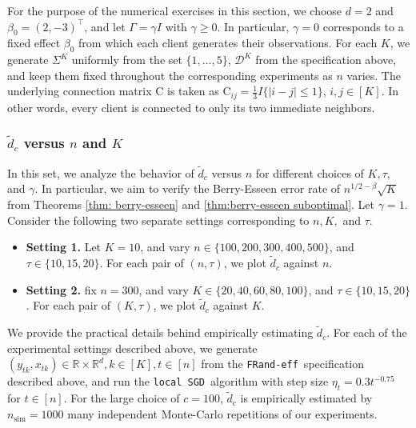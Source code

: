 \documentclass[a4paper,11pt]{article}
\numberwithin{equation}{section}
\theoremstyle{plain}
\theoremstyle{remark}
\def\R{\mathbb{R}}
\newcommand{\DFL}{\texttt{local SGD}}
\newcommand{\model}{\texttt{FRand-eff}}
\begin{document}
\noindent For the purpose of the numerical exercises in this section, we choose $d=2$ and $\beta_0=(2,-3)^\top$, and let $\Gamma=\gamma I$ with $\gamma\geq 0$. In particular, $\gamma=0$ corresponds to a fixed effect $\beta_0$ from which each client generates their observations. For each $K$, we generate $\Sigma^K$ uniformly from the set $\{1,\ldots,5\}$, $\mathcal{D}^K$ from the specification above, and keep them fixed throughout the corresponding experiments as $n$ varies. The underlying connection matrix $\mathrm{C}$ is taken as $\mathrm{C}_{ij}=\frac{1}{3}I\{|i-j|\leq 1\}$, $i,j\in [K]$. In other words, every client is connected to only its two immediate neighbors. 
\subsubsection{$\tilde{d}_c$ versus $n$ and $K$}
In this set, we analyze the behavior of $\tilde{d}_c$ versus $n$ for different choices of $K, \tau,$ and $\gamma$. In particular, we aim to verify the Berry-Esseen error rate of $n^{1/2-\beta}\sqrt{K}$ from Theorems \ref{thm: berry-esseen} and \ref{thm:berry-esseen suboptimal}. Let $\gamma=1$. Consider the following two separate settings corresponding to $n, K,$ and $\tau$. 
\begin{itemize}[noitemsep,topsep=0pt,parsep=0pt,partopsep=0pt]
    \item \textbf{Setting 1.} Let $K=10$, and vary $n\in \{100, 200, 300, 400, 500\}$, and $\tau \in \{10, 15, 20\}$. For each pair of $(n, \tau)$, we plot $\tilde{d}_c$ against $n$.
    \item \textbf{Setting 2.} fix $n=300$, and vary $K \in \{20,40,60,80,100\}$, and $\tau\in\{10,15,20\}$. For each pair of $(K, \tau)$, we plot $\tilde{d}_c$ against $K$.
\end{itemize}
 We provide the practical details behind empirically estimating $\tilde{d}_c$. For each of the experimental settings described above, we generate $(y_{tk}, x_{tk})\in \R \times \R^d, k\in [K], t \in [n]$ from the \model\ specification described above, and run the \DFL\ algorithm with step size $\eta_t=0.3t^{-0.75}$ for $t\in [n]$. For the large choice of $c=100$, $\tilde{d}_c$ is empirically estimated by $n_{\text{sim}}=1000$ many independent Monte-Carlo repetitions of our experiments.
\end{document}
